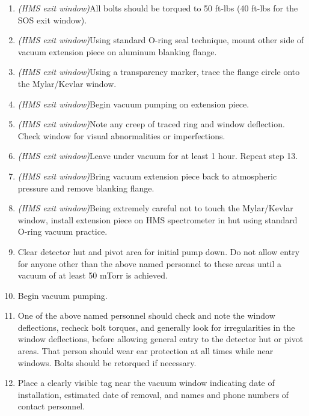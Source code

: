 {{\begin{enumerate}
\item{{\sl (HMS exit window)}All bolts should be torqued to 50 ft-lbs (40 ft-lbs for the SOS
exit window).}

\item{{\sl (HMS exit window)}Using standard O-ring seal technique, mount other side of
vacuum extension piece on aluminum blanking flange.}

\item{{\sl (HMS exit window)}Using a transparency marker, trace the flange circle onto the
Mylar/Kevlar window.}

\item{{\sl (HMS exit window)}Begin vacuum pumping on extension
piece.} 

\item{{\sl (HMS exit window)}Note any creep of traced ring and window
deflection.  Check window for visual abnormalities or imperfections.}

\item{{\sl (HMS exit window)}Leave under vacuum for at least 1 hour.
Repeat step 13.}

\item{{\sl (HMS exit window)}Bring vacuum extension piece back to
atmospheric pressure and remove blanking flange.}

\item{{\sl (HMS exit window)}Being extremely careful not to touch the
Mylar/Kevlar window, install extension piece on HMS spectrometer in
hut using standard O-ring vacuum practice.}

\item{Clear detector hut and pivot area for initial pump down. Do not
allow entry for anyone other than the above named personnel to
these areas until a vacuum of at least 50 mTorr is achieved.}

\item{Begin vacuum pumping.}

\item{One of the above named personnel should check and note the
window deflections, recheck bolt torques, and generally look for
irregularities in the window deflections, before allowing
general entry to the detector
hut or pivot areas. That person should wear ear protection at all times while
near windows. Bolts should be retorqued if necessary.}

\item{Place a clearly visible tag near the vacuum window indicating
date of installation, estimated date of removal, and names and phone
numbers of contact personnel.}


\end{enumerate}}}
